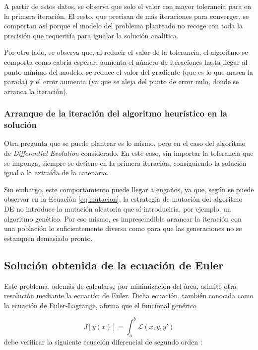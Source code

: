 A partir de estos datos, se observa que solo el valor con mayor tolerancia para en la primera iteración. El resto, que precisan de más iteraciones para converger, se comportan así porque el modelo del problema planteado no recoge con toda la precisión que requeriría para igualar la solución analítica.

Por otro lado, se observa que, al reducir el valor de la tolerancia, el algoritmo se comporta como cabría esperar: aumenta el número de iteraciones hasta llegar al punto mínimo del modelo, se reduce el valor del gradiente (que es lo que marca la parada) y el error aumenta (ya que se aleja del punto de error nulo, donde se arranca la iteración).


\subsubsection{Arranque de la iteración del algoritmo heurístico en la solución}

Otra pregunta que se puede plantear es lo mismo, pero en el caso del algoritmo de \textit{Differential Evolution} considerado. En este caso, sin importar la tolerancia que se imponga, siempre se detiene en la primera iteración, consiguiendo la solución igual a la extraída de la catenaria.

Sin embargo, este comportamiento puede llegar a engaños, ya que, según se puede observar en la Ecuación \ref{eq:mutacion}, la estrategia de mutación del algoritmo DE no introduce la mutación aleatoria que sí introduciría, por ejemplo, un algoritmo genético. Por eso mismo, es imprescindible arrancar la iteración con una población lo suficientemente diversa como para que las generaciones no se estanquen demasiado pronto. 


\subsection{Solución obtenida de la ecuación de Euler}

Este problema, además de calcularse por minimización del área, admite otra resolución mediante la ecuación de Euler. Dicha ecuación, también conocida como la ecuación de Euler-Lagrange, afirma que el funcional genérico

\begin{equation}
    J[y(x)] = \int_a^b \mathcal{L}(x, y, y')
\end{equation}
debe verificar la siguiente ecuación diferencial de segundo orden \cite{gelfand2000calculus}: 

